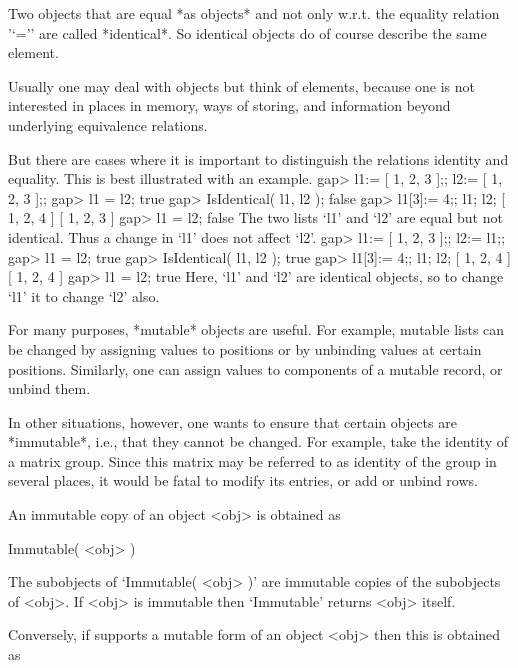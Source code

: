 
Two objects that are equal *as objects* and not only w.r.t. the equality
relation '`='' are called *identical*.
So identical objects do of course describe the same element.

Usually one may deal with objects but think of elements,
because one is not interested in places in memory, ways of storing,
and information beyond underlying equivalence relations.

But there are cases where it is important to distinguish the relations
identity and equality.
This is best illustrated with an example.
\beginexample
    gap> l1:= [ 1, 2, 3 ];; l2:= [ 1, 2, 3 ];;
    gap> l1 = l2;
    true
    gap> IsIdentical( l1, l2 );
    false
    gap> l1[3]:= 4;; l1; l2;
    [ 1, 2, 4 ]
    [ 1, 2, 3 ]
    gap> l1 = l2;
    false
\endexample
The two lists `l1' and `l2' are equal but not identical.
Thus a change in `l1' does not affect `l2'.
\beginexample
    gap> l1:= [ 1, 2, 3 ];; l2:= l1;;
    gap> l1 = l2;
    true
    gap> IsIdentical( l1, l2 );
    true
    gap> l1[3]:= 4;; l1; l2;
    [ 1, 2, 4 ]
    [ 1, 2, 4 ]
    gap> l1 = l2;
    true
\endexample
Here, `l1' and `l2' are identical objects,
so to change `l1' it to change `l2' also.


For many purposes, *mutable* objects are useful.
For example, mutable lists
can be changed by assigning values to positions
or by unbinding values at certain positions.
Similarly, one can assign values to components of a mutable record,
or unbind them.

In other situations, however,
one wants to ensure that certain objects are *immutable*,
i.e., that they cannot be changed.
For example, take the identity of a matrix group.
Since this matrix may be referred to as identity of the group in several
places, it would be fatal to modify its entries, or add or unbind rows.

An immutable copy of an object <obj> is obtained as

\>Immutable( <obj> )

The subobjects of `Immutable( <obj> )' are immutable copies of the
subobjects of <obj>.
If <obj> is immutable then `Immutable' returns <obj> itself.

Conversely, if {\GAP} supports a mutable form of an object <obj>
then this is obtained as

